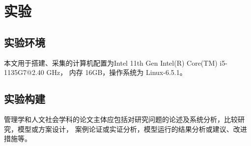 \section{实验}
\label{section:experiment}
\subsection{实验环境}
    本文用于搭建、采集的计算机配置为Intel 11th Gen Intel(R) Core(TM) i5-1135G7@2.40 GHz，
    内存 16GB，操作系统为 Linux-6.5.1。
\subsection{实验构建}
    管理学和人文社会学科的论文主体应包括对研究问题的论述及系统分析，比较研究，模型或方案设计，
    案例论证或实证分析，模型运行的结果分析或建议、改进措施等。
